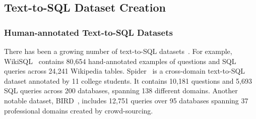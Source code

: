 \subsection{Text-to-SQL Dataset Creation}



\subsubsection{Human-annotated Text-to-SQL Datasets}
There has been a growing number of text-to-SQL datasets~\cite{atis, scholar, restaurants, geoquery, academic, yelp_and_IMDB, advising, wikisql, spider, spider_syn, spider_dk, dusql, kaggledbqa, bird}. 
For example, WikiSQL~\cite{wikisql} contains 80,654 hand-annotated examples of questions and SQL queries across 24,241 Wikipedia tables. Spider~\cite{spider} is a cross-domain text-to-SQL dataset annotated by 11 college students. It contains 10,181 questions and 5,693 SQL queries across 200 databases, spanning 138 different domains. Another notable dataset, BIRD~\cite{bird}, includes 12,751 queries over 95 databases spanning 37 professional domains created by crowd-sourcing.

